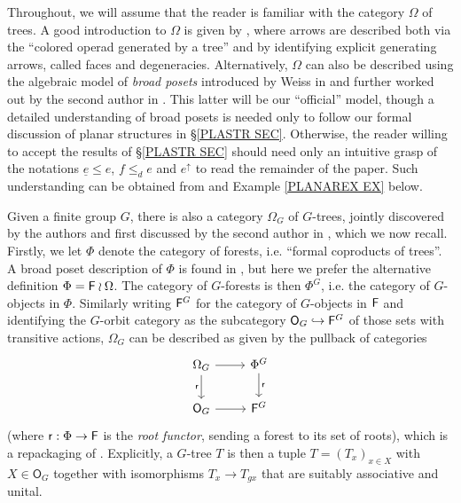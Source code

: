 \documentclass[a4paper,10pt]{article}%
\begin{document}
Throughout, we will assume that the reader is familiar with the category $\Omega$ of trees.
A good introduction to $\Omega$ is given by 
\cite[\S 3]{MW07}, where arrows are described both via 
the ``colored operad generated by a tree''  and by identifying explicit generating arrows, called faces and degeneracies.
Alternatively, $\Omega$ can also be described 
using the algebraic model of 
\textit{broad posets}
introduced by Weiss in \cite{We12} and further worked out by the second author in \cite[\S 5]{Pe17}.
This latter will be our ``official'' model,
though a detailed understanding of broad posets is needed only
to follow our formal discussion of planar structures in \S \ref{PLASTR SEC}.
Otherwise, the reader willing to accept the results of \S \ref{PLASTR SEC} should 
need only an intuitive grasp of the notations 
$\underline{e} \leq e$,
$f \leq_d e$ and $e^{\uparrow}$
to read the remainder of the paper.
Such understanding can be obtained from 
\cite[Example 5.10]{Pe17}
and Example \ref{PLANAREX EX} below.


Given a finite group $G$, there is also a category $\Omega_G$
of $G$-trees, jointly discovered by the authors and first discussed by the second author in 
\cite[\S 4.3,\S 5.3]{Pe17}, which we now recall.
Firstly, we let $\Phi$ denote the category of forests, i.e.
``formal coproducts of trees''.
A broad poset description of $\Phi$ is found in \cite[\S 5.2]{Pe17},
but here we prefer the alternative definition $\Phi = \mathsf{F} \wr \Omega$.
The category of $G$-forests is then 
$\Phi^G$, i.e. the category of $G$-objects in $\Phi$. 
Similarly writing
$\mathsf{F}^G$ for the category of $G$-objects in $\mathsf{F}$ and
identifying the $G$-orbit category as the subcategory
$\mathsf{O}_G \hookrightarrow \mathsf{F}^G$
of those sets with transitive actions, $\Omega_G$ can be described as given by the pullback of categories
\begin{equation}\label{OGDEF EQ}
\begin{tikzcd}
	\Omega_G \ar{r} \ar{d}[swap]{\mathsf{r}} & 
	\Phi^G \arrow{d}{\mathsf{r}}
\\
	\mathsf{O}_G \ar{r} & \Fin^G
\end{tikzcd}
\end{equation}
(where $\mathsf{r}: \Phi \to \mathsf{F}$ is the \emph{root functor},
sending a forest to its set of roots),
which is a repackaging of \cite[Def. 5.44]{Pe17}.
Explicitly, a $G$-tree $T$ is then a tuple 
$T = (T_x)_{x \in X}$ with $X \in \mathsf{O}_G$
together with isomorphisms
$T_x \to T_{g x}$ that are suitably associative and unital.
\end{document}
